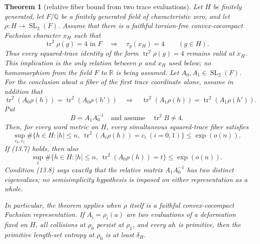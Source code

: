 \documentclass[11pt,reqno]{amsart}
\newtheorem{theorem}{Theorem}[section]
\theoremstyle{definition}
\theoremstyle{remark}
\newcommand{\R}{\mathbb R}
\newcommand{\Q}{\mathbb Q}
\newcommand{\Tr}{\operatorname{tr}}
\newcommand{\SL}{\operatorname{SL}}
\begin{document}
\begin{theorem}[relative fiber bound from two trace evaluations]
\label{thm:two-trace-evaluations}
Let \(H\) be finitely generated, let \(F/\Q\) be a finitely generated field
of characteristic zero, and let
\(\rho\colon H\to\SL_2(F)\).  Assume that there is a faithful torsion-free
convex-cocompact Fuchsian character \(x_H\) such that
\[
 \Tr^2\rho(g)=4\text{ in }F
 \quad\Longrightarrow\quad \tau_g(x_H)=4
 \qquad(g\in H).
\]
Thus every squared-trace identity of the form
\(\Tr^2\rho(g)=4\) remains valid at \(x_H\).  This implication is the only
relation between \(\rho\) and \(x_H\) used below; no homomorphism from the
field \(F\) to \(\R\) is being assumed.
Let \(A_0,A_1\in\SL_2(F)\).  For the conclusion about a fiber of the first
trace coordinate alone, assume in addition that
\[
 \Tr^2(A_0\rho(h))=\Tr^2(A_0\rho(h'))
 \quad\Longrightarrow\quad
 \Tr^2(A_1\rho(h))=\Tr^2(A_1\rho(h')).
\tag{13.7}
\]
Put
\[
 B=A_1A_0^{-1}
 \quad\text{and assume}\quad \Tr^2B\ne4.
\tag{13.8}
\]
Then, for every word metric on \(H\), every simultaneous squared-trace
fiber satisfies
\[
 \sup_{c_0,c_1}\#
 \{h\in H:|h|\le n,\ \Tr^2(A_i\rho(h))=c_i\ (i=0,1)\}
 \le\exp(o(n)).
\]
If (13.7) holds, then also
\[
 \sup_t\#\{h\in H:|h|\le n,\ \Tr^2(A_0\rho(h))=t\}
   \le\exp(o(n)).
\tag{13.9}
\]
Condition (13.8) says exactly that the relative matrix
\(A_1A_0^{-1}\) has two distinct eigenvalues; no semisimplicity hypothesis
is imposed on either representation as a whole.

In particular, the theorem applies when \(\rho\) itself is a faithful
convex-cocompact Fuchsian representation.  If
\(A_i=\rho_i(a)\) are two evaluations of a deformation fixed on \(H\), all
collisions at \(\rho_0\) persist at \(\rho_1\), and every \(ah\) is
primitive, then the primitive length-set entropy at \(\rho_0\) is at least
\(\delta_H\).
\end{theorem}
\end{document}
